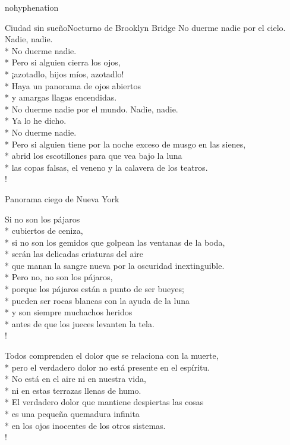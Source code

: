 \documentclass[
    a5paper,
    DIV=10,
    12pt,
    notitlepage,
    oneside,]
{scrbook} %
\begin{document}
\begin{hyphenrules}{nohyphenation}
\begin{poem}{Ciudad sin sueño}{Nocturno de Brooklyn Bridge}{}
No duerme nadie por el cielo. Nadie, nadie.\\*
No duerme nadie.\\*
Pero si alguien cierra los ojos,\\*
¡azotadlo, hijos míos, azotadlo!\\*
Haya un panorama de ojos abiertos\\*
y amargas llagas encendidas.\\*
No duerme nadie por el mundo. Nadie, nadie.\\*
Ya lo he dicho.\\*
No duerme nadie.\\*
Pero si alguien tiene por la noche exceso de musgo en las sienes,\\*
abrid los escotillones para que vea bajo la luna\\*
las copas falsas, el veneno y la calavera de los teatros.\\!

\end{poem}

\begin{poem}{Panorama ciego de Nueva York}{}{}

Si no son los pájaros\\*
cubiertos de ceniza,\\*
si no son los gemidos que golpean las ventanas de la boda,\\*
serán las delicadas criaturas del aire\\*
que manan la sangre nueva por la oscuridad inextinguible.\\*
Pero no, no son los pájaros,\\*
porque los pájaros están a punto de ser bueyes;\\*
pueden ser rocas blancas con la ayuda de la luna\\*
y son siempre muchachos heridos\\*
antes de que los jueces levanten la tela.\\!

Todos comprenden el dolor que se relaciona con la muerte,\\*
pero el verdadero dolor no está presente en el espíritu.\\*
No está en el aire ni en nuestra vida,\\*
ni en estas terrazas llenas de humo.\\*
El verdadero dolor que mantiene despiertas las cosas\\*
es una pequeña quemadura infinita\\*
en los ojos inocentes de los otros sistemas.\\!


\end{poem}
\end{hyphenrules}
\end{document}
